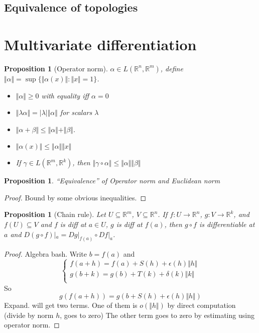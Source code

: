 \documentclass{article}
\theoremstyle{definition}
\theoremstyle{remark}
\theoremstyle{plain}
\newtheorem{prop}[defn]{Proposition}
\theoremstyle{definition}
\newcommand{\RR}{\mathbb{R}}
\begin{document}
\subsection{Equivalence of topologies}

\section{Multivariate differentiation}
\begin{prop}[Operator norm]
    $\alpha\in L(\RR^n,\RR^m)$, define $\Vert\alpha\Vert=\sup\{\Vert\alpha(x)\Vert:\Vert x\Vert=1\}$.
    \begin{itemize}
        \item $\Vert\alpha\Vert\ge 0$ with equality iff $\alpha=0$
        \item $\Vert\lambda\alpha\Vert=\vert\lambda\vert\Vert\alpha\Vert$ for scalars $\lambda$
        \item $\Vert\alpha+\beta\Vert\le\Vert\alpha\Vert+\Vert\beta\Vert$.
        \item $\Vert\alpha(x)\Vert\le\Vert\alpha\Vert\Vert x\Vert$
        \item If $\gamma\in L(\RR^m,\RR^k)$, then $\Vert\gamma\circ\alpha\Vert\le\Vert\alpha\Vert\Vert\beta\Vert$
    \end{itemize}
\end{prop}
\begin{prop}
    ``Equivalence'' of Operator norm and Euclidean norm
\end{prop}
\begin{proof}
    Bound by some obvious inequalities.
\end{proof}
\begin{prop}[Chain rule]
    Let $U\subseteq \RR^m$, $V\subseteq \RR^n$. If $f:U\to\RR^n$, $g:V\to \RR^k$, and $f(U)\subseteq V$ and $f$ is diff at $a\in U$, $g$ is diff at $f(a)$, then $g\circ f$ is differentiable at $a$ and $D(g\circ f)|_a=Dg|_{f(a)}\circ Df|_a$.
\end{prop}
\begin{proof}
    Algebra bash. Write $b=f(a)$ and
    \[\begin{cases}
        f(a+h)=f(a)+S(h)+\epsilon(h)\Vert h\Vert\\
        g(b+k)=g(b)+T(k)+\delta(k)\Vert k\Vert \\
    \end{cases}\]
    So
    \[g(f(a+h))=g(b+S(h)+\epsilon(h)\Vert h\Vert)\]
    Expand. will get two terms. One of them is $o(\Vert h\Vert)$ by direct computation (divide by norm $h$, goes to zero) The other term goes to zero by estimating using operator norm.
\end{proof}
\end{document}
